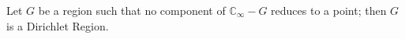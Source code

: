 Let $G$ be a region such that no component of $\mathbb{C}_\infty - G$ reduces to a point; then $G$ is a Dirichlet Region.
